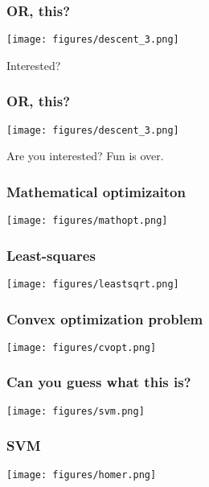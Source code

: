 \documentclass[10pt,mathserif]{beamer}
\begin{document}
\begin{frame}\frametitle{OR, this?}
\begin{center}
\texttt{[image: figures/descent\_3.png]}
\end{center}
\begin{block}{Interested?}

\end{block}
\end{frame}

\begin{frame}\frametitle{OR, this?}
	\begin{center}
		\texttt{[image: figures/descent\_3.png]}
	\end{center}
	\begin{block}{Are you interested?}
		Fun is over.
	\end{block}
\end{frame}


\begin{frame}\frametitle{Mathematical optimizaiton}
\begin{center}
\texttt{[image: figures/mathopt.png]}
\end{center}
\end{frame}

\begin{frame}\frametitle{Least-squares}
\begin{center}
\texttt{[image: figures/leastsqrt.png]}
\end{center}
\end{frame}

\begin{frame}\frametitle{Convex optimization problem}
\begin{center}
\texttt{[image: figures/cvopt.png]}
\end{center}
\end{frame}

\begin{frame}\frametitle{Can you guess what this is?}
\begin{center}
\texttt{[image: figures/svm.png]}
\end{center}
\end{frame}

\begin{frame}\frametitle{SVM}
\begin{center}
\texttt{[image: figures/homer.png]}
\end{center}
\end{frame}
\end{document}
